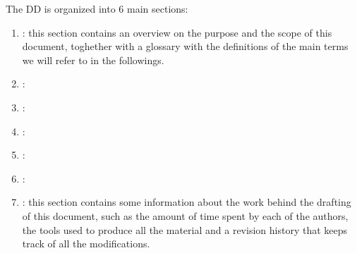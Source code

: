 The DD is organized into 6 main sections:

\begin{enumerate}
\item {\textbf{}}: this section contains an overview on the purpose and the scope of this document, toghether with a glossary with the definitions of the main terms we will refer to in the followings.
\item {\textbf{}}: 
\item {\textbf{}}:
\item {\textbf{}}:
\item {\textbf{}}: 
\item {\textbf{}}: 
\item {\textbf{}}: this section contains some information about the work behind the drafting of this
document, such as the amount of time spent by each of the authors, the tools used to produce all
the material and a revision history that keeps track of all the modifications.
\end{enumerate}